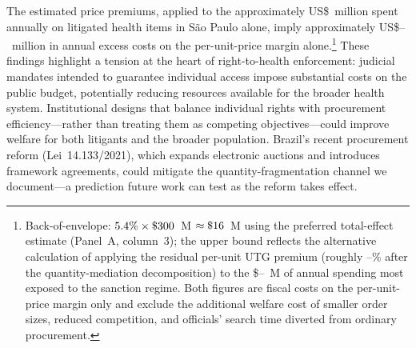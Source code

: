 The estimated price premiums, applied to the approximately US\$\BPlitSpendingUSDmm~million spent annually on litigated health items in S\~ao Paulo alone, imply approximately US\$\BPexcessUSDmmLow--\BPexcessUSDmmHigh~million in annual excess costs on the per-unit-price margin alone.\footnote{Back-of-envelope: $5.4\% \times \$300$~M $\approx \$16$~M using the preferred total-effect estimate (Panel~A, column~3); the upper bound reflects the alternative calculation of applying the residual per-unit UTG premium (roughly \BPresidualUTGpctLow--\BPresidualUTGpctHigh\% after the quantity-mediation decomposition) to the \$\BPsanctionExposedUSDmmLow--\BPsanctionExposedUSDmmHigh~M of annual spending most exposed to the sanction regime. Both figures are fiscal costs on the per-unit-price margin only and exclude the additional welfare cost of smaller order sizes, reduced competition, and officials' search time diverted from ordinary procurement.} These findings highlight a tension at the heart of right-to-health enforcement: judicial mandates intended to guarantee individual access impose substantial costs on the public budget, potentially reducing resources available for the broader health system. Institutional designs that balance individual rights with procurement efficiency---rather than treating them as competing objectives---could improve welfare for both litigants and the broader population. Brazil's recent procurement reform (Lei~14.133/2021), which expands electronic auctions and introduces framework agreements, could mitigate the quantity-fragmentation channel we document---a prediction future work can test as the reform takes effect.
